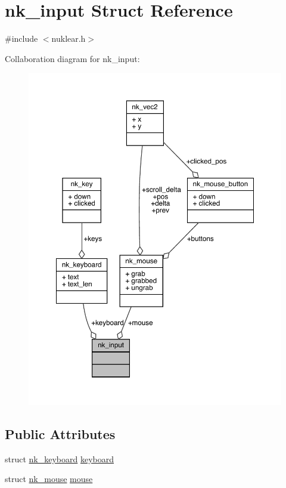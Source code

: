 \hypertarget{structnk__input}{}\section{nk\+\_\+input Struct Reference}
\label{structnk__input}


{\ttfamily \#include $<$nuklear.\+h$>$}



Collaboration diagram for nk\+\_\+input\+:
\nopagebreak
\begin{figure}[H]
\begin{center}
\leavevmode
\includegraphics[width=350pt]{structnk__input__coll__graph}
\end{center}
\end{figure}
\subsection*{Public Attributes}
\begin{DoxyCompactItemize}
\item 
struct \mbox{\hyperlink{structnk__keyboard}{nk\+\_\+keyboard}} \mbox{\hyperlink{structnk__input_a07db4d8c752d4e9fcc7e18638dfa8740}{keyboard}}
\item 
struct \mbox{\hyperlink{structnk__mouse}{nk\+\_\+mouse}} \mbox{\hyperlink{structnk__input_ac34a784eebb90e3c839a8008f2127c61}{mouse}}
\end{DoxyCompactItemize}


